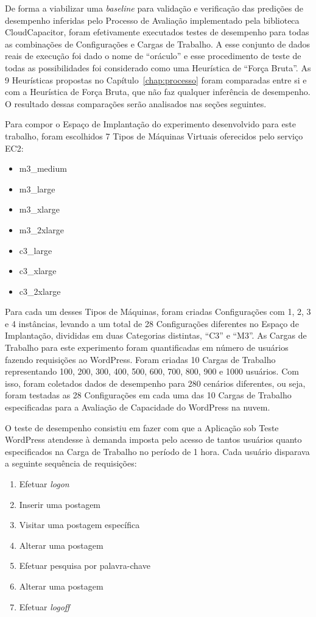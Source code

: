 De forma a viabilizar uma \emph{baseline} para validação e verificação das 
predições de desempenho inferidas pelo Processo de Avaliação implementado pela 
biblioteca CloudCapacitor, foram efetivamente executados testes de desempenho 
para todas as combinações de Configurações e Cargas de Trabalho. A esse conjunto
de dados reais de execução foi dado o nome de ``oráculo'' e esse procedimento
de teste de todas as possibilidades foi considerado como uma Heurística de ``Força
Bruta''. As 9 Heurísticas propostas no Capítulo~\ref{chap:processo} foram comparadas
entre si e com a Heurística de Força Bruta, que não faz qualquer inferência de
desempenho. O resultado dessas comparações serão analisados nas seções seguintes.

Para compor o Espaço de Implantação do experimento desenvolvido para este trabalho, 
foram escolhidos 7 Tipos de Máquinas Virtuais oferecidos pelo serviço EC2:

\begin{itemize}
  \item m3\_medium 
  \item m3\_large
  \item m3\_xlarge
  \item m3\_2xlarge
  \item c3\_large
  \item c3\_xlarge
  \item c3\_2xlarge
\end{itemize}

Para cada um desses Tipos de Máquinas, foram criadas Configurações com 1, 2, 3 e 4
instâncias, levando a um total de 28 Configurações diferentes no Espaço de Implantação,
divididas em duas Categorias distintas, ``C3'' e ``M3''. As Cargas de Trabalho
para este experimento foram quantificadas em número de usuários fazendo
requisições ao WordPress. Foram criadas 10 Cargas de Trabalho representando
100, 200, 300, 400, 500, 600, 700, 800, 900 e 1000 usuários. Com isso, foram
coletados dados de desempenho para 280 cenários diferentes, ou seja, foram 
testadas as 28 Configurações em cada uma das 10 Cargas de Trabalho especificadas 
para a Avaliação de Capacidade do WordPress na nuvem.

O teste de desempenho consistiu em fazer com que a Aplicação sob Teste WordPress
atendesse à demanda imposta pelo acesso de tantos usuários quanto especificados 
na Carga de Trabalho no período de 1 hora. Cada usuário disparava a seguinte
sequência de requisições:

\begin{enumerate}
  \item Efetuar \emph{logon}
  \item Inserir uma postagem
  \item Visitar uma postagem específica
  \item Alterar uma postagem
  \item Efetuar pesquisa por palavra-chave
  \item Alterar uma postagem
  \item Efetuar \emph{logoff}
\end{enumerate}

